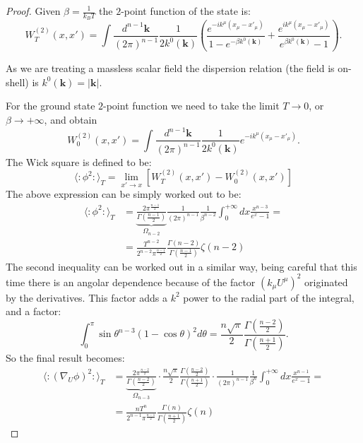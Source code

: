 \begin{proof}
    Given \(\beta = \frac{1}{k_BT}\) the \(2\)-point function of the state is:
	\[
	W^{(2)}_T(x, x') = \int \frac{d^{n - 1}\mathbf{k}}{(2\pi)^{n - 1}}\frac{1}{2k^0(\mathbf{k})} \left(\frac{e^{-ik^{\mu}(x_{\mu} - x'_{\mu})}}{1 - e^{-\beta k^0(\mathbf{k})}} + \frac{e^{ik^{\mu}(x_{\mu} - x'_{\mu})}}{e^{\beta k^0(\mathbf{k})} - 1}\right). 
	\]

	As we are treating a massless scalar field the dispersion relation (the field is on-shell) is \(k^0(\mathbf{k}) = \vert \mathbf{k}\vert\).

	For the ground state \(2\)-point function we need to take the limit \(T\rightarrow 0\), or \(\beta\rightarrow +\infty\), and obtain
	\[
	W^{(2)}_0(x, x') = \int \frac{d^{n - 1}\mathbf{k}}{(2\pi)^{n - 1}}\frac{1}{2k^0(\mathbf{k})} e^{-ik^{\mu}(x_{\mu} - x'_{\mu})}. 
	\]
	The Wick square is defined to be:
	\[
		\langle \colon \phi^2 \colon\rangle_T = \lim_{x'\rightarrow x} \left[W^{(2)}_T(x, x') - W^{(2)}_0(x, x')\right]
	\]
	The above expression can be simply worked out to be:
	\begin{align*}
		\langle \colon \phi^2 \colon\rangle_T &= \underbrace{\frac{2\pi^{\frac{n-1}{2}}}{\Gamma(\frac{n - 1}{2})}}_{\Omega_{n - 2}}\frac{1}{(2\pi)^{n - 1}}\frac{1}{\beta^{n - 2}}\int_0^{+\infty}dx \frac{x^{n - 3}}{e^x - 1} =\\
		&= \frac{T^{n - 2}}{2^{n - 2}\pi^{\frac{n - 1}{2}}}\frac{\Gamma(n - 2)}{\Gamma\left(\frac{n - 1}{2}\right)}\zeta(n - 2)
	\end{align*}
	The second inequality can be worked out in a similar way, being careful that this time there is an angolar dependence because of the factor \((k_{\mu}U^{\mu})^2\) originated by the derivatives. This factor adds a \(k^2\) power to the radial part of the integral, and a factor:
	\[
	\int_0^{\pi} \sin\theta^{n - 3} (1 - \cos\theta)^2 d\theta = \frac{n\sqrt{\pi}}{2}\frac{\Gamma\left(\frac{n - 2}{2}\right)}{\Gamma\left(\frac{n + 1}{2}\right)}.
	\]
	So the final result becomes:
	\begin{align*}
		\langle \colon (\nabla_U\phi)^2 \colon\rangle_T &= 
		\underbrace{\frac{2\pi^{\frac{n-2}{2}}}{\Gamma(\frac{n - 2}{2})}}_{\Omega_{n - 3}} \cdot \frac{n\sqrt{\pi}}{2}\frac{\Gamma\left(\frac{n - 2}{2}\right)}{\Gamma\left(\frac{n + 1}{2}\right)} \cdot \frac{1}{(2\pi)^{n - 1}}\frac{1}{\beta^{n}}\int_0^{+\infty}dx \frac{x^{n - 1}}{e^x - 1} = \\
		&= \frac{nT^n}{2^{n - 1}\pi^{\frac{n - 1}{2}}} \frac{\Gamma(n)}{\Gamma\left(\frac{n + 1}{2}\right)} \zeta(n)
	\end{align*}
\end{proof}

